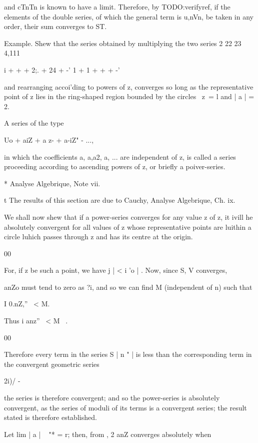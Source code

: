and cTnTn is known to have a limit. Therefore, by TODO:verifyref, if the
elements of the double series, of which the general term is u,nVn, be
taken in any order, their sum converges to ST.

Example. Shew that the series obtained by multiplying the two series 2
22 23 4,111

i + + + 2;. + 24 + -' 1 + 1 + + + -'

and rearranging accoi'ding to powers of z, converges so long as the
representative point of z lies in the ring-shaped region bounded by
the circles \ z\ = l and | a | = 2.


A series of the type

Uo + aiZ + a z- + a-iZ" - ...,

in which the coefficients a, a,a2, a, ... are independent of z, is
called a series proceeding according to ascending powers of z, or
briefly a poiver-series.

* Analyse Algebrique, Note vii.

t The results of this section are due to Cauchy, Analyse Algebrique,
Ch. ix.

%
%

We shall now shew that if a power-series converges for any value z of
z, it ivill he absolutely convergent for all values of z whose
representative points are luithin a circle luhich passes through z and
has its centre at the origin.

00

For, if z be such a point, we have j | < i 'o | . Now, since S, V
converges,

anZo must tend to zero as ?i\rightarrow \infty, and so we can find M (independent
of n) such that

I 0.nZ,'' \ < M.

Thus i anz'' \ < M \ .

00

Therefore every term in the series S | n " | is less than the
corresponding term in the convergent geometric series

2i)/ -

the series is therefore convergent; and so the power-series is
absolutely convergent, as the series of moduli of its terms is a
convergent series; the result stated is therefore established.

Let lim | a | ~ "* = r; then, from , 2 anZ converges absolutely
when

